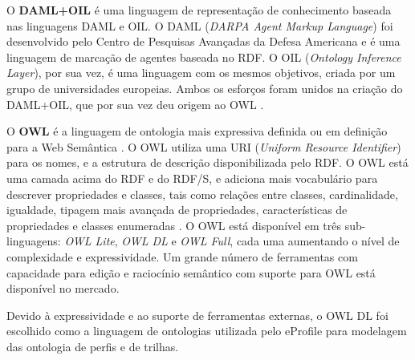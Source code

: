 O \textbf{DAML+OIL} é uma linguagem de representação de conhecimento baseada nas linguagens DAML e OIL. O DAML ({\em DARPA Agent Markup Language}) foi desenvolvido pelo Centro de Pesquisas Avançadas da Defesa Americana e é uma linguagem de marcação de agentes baseada no RDF. O OIL ({\em Ontology Inference Layer}), por sua vez, é uma linguagem com os mesmos objetivos, criada por um grupo de universidades europeias. Ambos os esforços foram unidos na criação do DAML+OIL, que por sua vez deu origem ao OWL \cite{daconta03}.

O \textbf{OWL} é a linguagem de ontologia mais expressiva definida ou em definição para a Web Semântica \cite{daconta03}. O OWL utiliza uma URI ({\em Uniform Resource Identifier}) para os nomes, e a estrutura de descrição disponibilizada pelo RDF. O OWL está uma camada acima do RDF e do RDF/S, e adiciona mais vocabulário para descrever propriedades e classes, tais como relações entre classes, cardinalidade, igualdade, tipagem mais avançada de propriedades, características de propriedades e classes enumeradas \cite{owl-guide}. O OWL está disponível em três sub-linguagens: {\em OWL Lite}, {\em OWL DL} e {\em OWL Full}, cada uma aumentando o nível de complexidade e expressividade. Um grande número de ferramentas com capacidade para edição e raciocínio semântico com suporte para OWL está disponível no mercado.

Devido à expressividade e ao suporte de ferramentas externas, o OWL DL foi escolhido como a linguagem de ontologias utilizada pelo eProfile para modelagem das ontologia de perfis e de trilhas.






